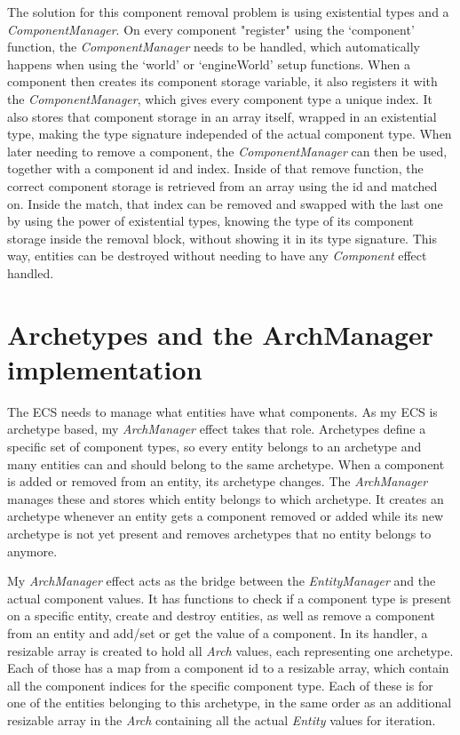 The solution for this component removal problem is using existential types and a \textit{ComponentManager}. On every component "register" using the `component' function, the \textit{ComponentManager} needs to be handled, which automatically happens when using the `world' or `engineWorld' setup functions. When a component then creates its component storage variable, it also registers it with the \textit{ComponentManager}, which gives every component type a unique index. It also stores that component storage in an array itself, wrapped in an existential type, making the type signature independed of the actual component type. When later needing to remove a component, the \textit{ComponentManager} can then be used, together with a component id and index. Inside of that remove function, the correct component storage is retrieved from an array using the id and matched on. Inside the match, that index can be removed and swapped with the last one by using the power of existential types, knowing the type of its component storage inside the removal block, without showing it in its type signature. This way, entities can be destroyed without needing to have any \textit{Component} effect handled.

\section{Archetypes and the ArchManager implementation}

The ECS needs to manage what entities have what components. As my ECS is archetype based, my \textit{ArchManager} effect takes that role. Archetypes define a specific set of component types, so every entity belongs to an archetype and many entities can and should belong to the same archetype. When a component is added or removed from an entity, its archetype changes. The \textit{ArchManager} manages these and stores which entity belongs to which archetype. It creates an archetype whenever an entity gets a component removed or added while its new archetype is not yet present and removes archetypes that no entity belongs to anymore.

My \textit{ArchManager} effect acts as the bridge between the \textit{EntityManager} and the actual component values. It has functions to check if a component type is present on a specific entity, create and destroy entities, as well as remove a component from an entity and add/set or get the value of a component. In its handler, a resizable array is created to hold all \textit{Arch} values, each representing one archetype. Each of those has a map from a component id to a resizable array, which contain all the component indices for the specific component type. Each of these is for one of the entities belonging to this archetype, in the same order as an additional resizable array in the \textit{Arch} containing all the actual \textit{Entity} values for iteration.

